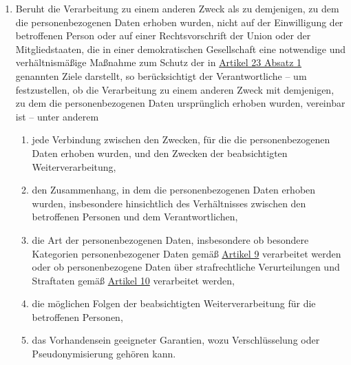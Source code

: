 \begin{enumerate}
  \item Beruht die Verarbeitung zu einem anderen Zweck als zu demjenigen, zu dem die personenbezogenen Daten erhoben
   wurden, nicht auf der Einwilligung der betroffenen Person oder auf einer Rechtsvorschrift der Union oder der
   Mitgliedstaaten, die in einer demokratischen Gesellschaft eine notwendige und verhältnismäßige Maßnahme zum Schutz
   der in \hyperref[itm:23-1]{Artikel 23 Absatz 1} genannten Ziele darstellt, so berücksichtigt der Verantwortliche --
   um festzustellen, ob die Verarbeitung zu einem anderen Zweck mit demjenigen, zu dem die personenbezogenen Daten
   ursprünglich erhoben wurden, vereinbar ist -- unter anderem
  \label{itm:06-4}

  \begin{enumerate}
  
    \item jede Verbindung zwischen den Zwecken, für die die personenbezogenen Daten erhoben wurden, und den Zwecken der
     beabsichtigten Weiterverarbeitung,
    \label{itm:06-4a}

    \item den Zusammenhang, in dem die personenbezogenen Daten erhoben wurden, insbesondere hinsichtlich des
     Verhältnisses zwischen den betroffenen Personen und dem Verantwortlichen,
    \label{itm:06-4b}

    \item die Art der personenbezogenen Daten, insbesondere ob besondere Kategorien personenbezogener Daten gemäß
     \hyperref[ch:9]{Artikel 9} verarbeitet werden oder ob personenbezogene Daten über strafrechtliche Verurteilungen
      und Straftaten gemäß \hyperref[ch:10]{Artikel 10} verarbeitet werden,
    \label{itm:06-4c}

    \item die möglichen Folgen der beabsichtigten Weiterverarbeitung für die betroffenen Personen,
    \label{itm:06-4d}

    \item das Vorhandensein geeigneter Garantien, wozu Verschlüsselung oder Pseudonymisierung gehören kann.
    \label{itm:06-4e}

  \end{enumerate}

\end{enumerate}


